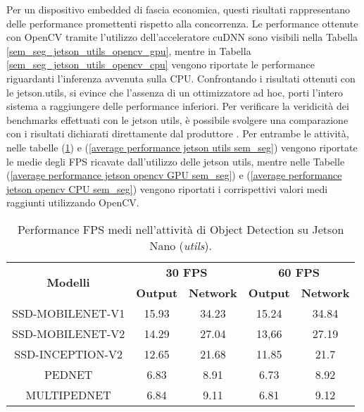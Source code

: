 Per un dispositivo embedded di fascia economica, questi risultati rappresentano delle performance promettenti rispetto alla concorrenza.
Le performance ottenute con OpenCV tramite l'utilizzo dell'acceleratore cuDNN sono visibili nella Tabella \ref{sem_seg_jetson_utils_opencv_gpu}, mentre in Tabella \ref{sem_seg_jetson_utils_opencv_cpu} vengono riportate le performance riguardanti l'inferenza avvenuta sulla CPU.
Confrontando i risultati ottenuti con le jetson.utils, si evince che l'assenza di un ottimizzatore ad hoc, porti l'intero sistema a raggiungere delle performance inferiori.
Per verificare la veridicità dei benchmarks effettuati con le jetson utils, è possibile svolgere una comparazione con i risultati dichiarati direttamente dal produttore \cite{performance_obj_det_jetson}.
Per entrambe le attività, nelle tabelle (\ref{average performance jetson utils obj_det}) e (\ref{average performance jetson utils sem_seg}) vengono riportate le medie degli FPS ricavate dall'utilizzo delle jetson utils, mentre nelle Tabelle (\ref{average performance jetson opencv GPU sem_seg}) e (\ref{average performance jetson opencv CPU sem_seg})  vengono riportati i corrispettivi valori medi raggiunti utilizzando OpenCV.

\begin{table}
    \renewcommand{\baselinestretch}{1}
    \centering
    \begin{adjustbox}{max width=\textwidth}
    \begin{tabular}{|c||c|c||c|c||}
        \hline
        \multirow{2}{*}{\bfseries{\Large Modelli}} & \multicolumn{2}{c||}{\bfseries{30 FPS}} & \multicolumn{2}{c||}{\bfseries{60 FPS}}\\            & \bfseries{Output} & \bfseries{Network} & \bfseries{Output} & \bfseries{Network}\\
        \hline
        \hline
        SSD-MOBILENET-V1 & 15.93 & 34.23 & 15.24 & 34.84\\
        \hline
        SSD-MOBILENET-V2 & 14.29 & 27.04 & 13,66 & 27.19\\
        \hline 
        SSD-INCEPTION-V2 & 12.65 & 21.68 & 11.85 & 21.7\\
        \hline
        PEDNET & 6.83 &  8.91 & 6.73 & 8.92\\
        \hline
        MULTIPEDNET & 6.84 & 9.11 & 6.81 & 9.12\\
        \hline
    \end{tabular}
    \end{adjustbox}
    \vspace{0.5cm}
    \caption{Performance FPS medi nell'attività di Object Detection su Jetson Nano (\emph{utils}).}
    \label{average performance jetson utils obj_det}
\end{table}

